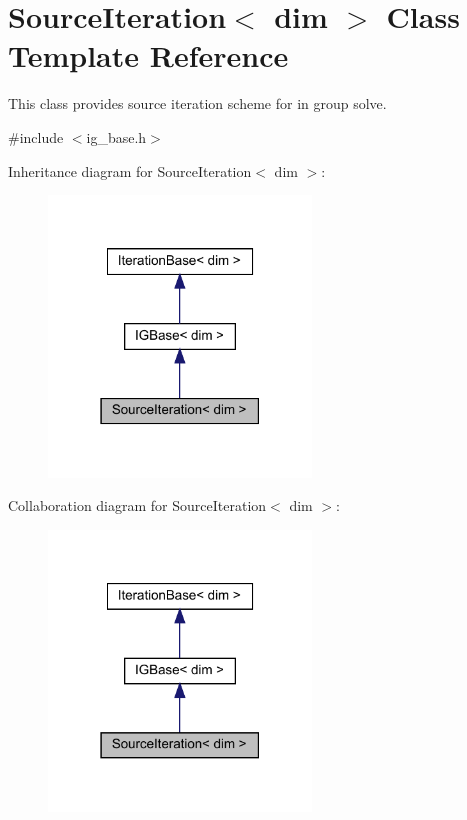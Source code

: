 \hypertarget{class_source_iteration}{}\section{Source\+Iteration$<$ dim $>$ Class Template Reference}
\label{class_source_iteration}


This class provides source iteration scheme for in group solve.  




{\ttfamily \#include $<$ig\+\_\+base.\+h$>$}



Inheritance diagram for Source\+Iteration$<$ dim $>$\+:\nopagebreak
\begin{figure}[H]
\begin{center}
\leavevmode
\includegraphics[width=198pt]{class_source_iteration__inherit__graph}
\end{center}
\end{figure}


Collaboration diagram for Source\+Iteration$<$ dim $>$\+:\nopagebreak
\begin{figure}[H]
\begin{center}
\leavevmode
\includegraphics[width=198pt]{class_source_iteration__coll__graph}
\end{center}
\end{figure}
